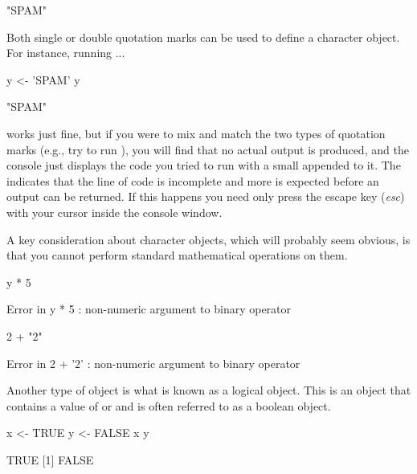 \begin{outR}
[1] "SPAM"
\end{outR}

\noindent
Both single or double quotation marks can be used to define a character object. For instance, running ...

\begin{inR}
y <- 'SPAM'
y
\end{inR}

\begin{outR}
[1] "SPAM"
\end{outR}

\noindent
works just fine, but if you were to mix and match the two types of quotation marks (e.g., try to run ), you will find that no actual output is produced, and the console just displays the code you tried to run with a small \R{+} appended to it. The \R{+} indicates that the line of code is incomplete and more is expected before an output can be returned. If this happens you need only press the escape key (\textit{esc}) with your cursor inside the console window.

A key consideration about character objects, which will probably seem obvious, is that you cannot perform standard mathematical operations on them.

\begin{inR}
y * 5
\end{inR}

\begin{outR}
Error in y * 5 : non-numeric argument to binary operator
\end{outR}

\begin{inR}
2 + "2"
\end{inR}

\begin{outR}
Error in 2 + '2' : non-numeric argument to binary operator
\end{outR}

Another type of object is what is known as a \gls{logical} object.  This is an object that contains a value of  or  and is often referred to as a \gls{boolean} object.

\begin{inR}
x <- TRUE
y <- FALSE
x
y
\end{inR}

\begin{outR}
[1] TRUE
[1] FALSE
\end{outR}

